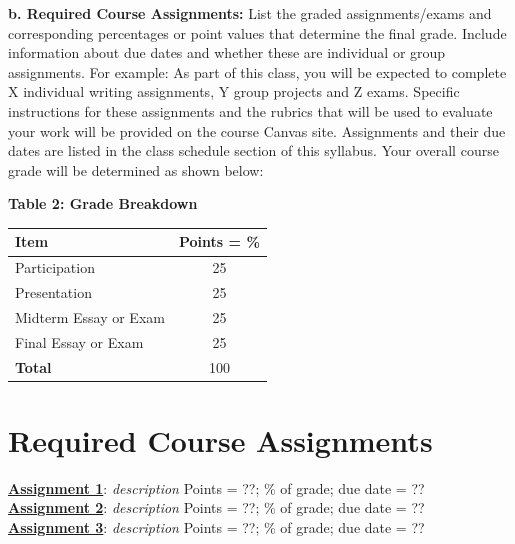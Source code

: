 \documentclass[12pt]{article}
\begin{document}
\vspace{1em}

\noindent \textbf{b. Required Course Assignments:} {\color{annotationblue}List the graded assignments/exams and corresponding percentages or point values that determine the final grade. Include information about due dates and whether these are individual or group assignments.} {\color{suggestionred}For example: As part of this class, you will be expected to complete X individual writing assignments, Y group projects and Z exams. Specific instructions for these assignments and the rubrics that will be used to evaluate your work will be provided on the course Canvas site. Assignments and their due dates are listed in the class schedule section of this syllabus. Your overall course grade will be determined as shown below:}

\vspace{0.5em}

\begin{center}
\textbf{Table 2: Grade Breakdown}
\end{center}

\begin{center}
\begin{tabular}{|l|c|}
\hline
\textbf{Item} & \textbf{Points = \%} \\
\hline
Participation & 25 \\
Presentation & 25 \\
Midterm Essay or Exam & 25 \\
Final Essay or Exam & 25 \\
\hline
\textbf{Total} & 100 \\
\hline
\end{tabular}
\end{center}

\vspace{0.5em}


\section*{Required Course Assignments}

\noindent \textbf{\underline{Assignment 1}}: \textit{description} Points = ??; \% of grade; due date = ??
\vspace{0.3em} \\
\noindent \textbf{\underline{Assignment 2}}: \textit{description} Points = ??; \% of grade; due date = ??
\vspace{0.3em} \\
\noindent \textbf{\underline{Assignment 3}}: \textit{description} Points = ??; \% of grade; due date = ??
\end{document}
